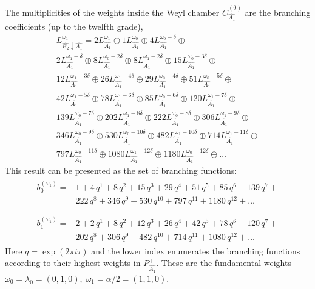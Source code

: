 \documentclass[12pt]{iopart}
\theoremstyle{definition}
\begin{document}
The multiplicities of the weights inside the  Weyl chamber
$\bar{C}^{\left( 0 \right)}_{\hat{A_1}}$
are the branching coefficients (up to the twelfth grade),
\begin{eqnarray*}
  \label{eq:28}
  L^{\omega_1}_{\hat{B_2}\downarrow \hat{A_1}}=2 L_{\hat{A_1}}^{\omega_1}\oplus 1 L_{\hat{A_1}}^{\omega_0}\oplus 4 L_{\hat{A_1}}^{\omega_0-\delta}\oplus\\
    2 L_{\hat{A_1}}^{\omega_1-\delta}\oplus 8 L_{\hat{A_1}}^{\omega_0-2\delta}\oplus
    8 L_{\hat{A_1}}^{\omega_1-2\delta}\oplus 15 L_{\hat{A_1}}^{\omega_0-3\delta}\oplus\\
    12 L_{\hat{A_1}}^{\omega_1-3\delta}\oplus 26 L_{\hat{A_1}}^{\omega_1-4\delta}\oplus
    29 L_{\hat{A_1}}^{\omega_0-4\delta}\oplus 51 L_{\hat{A_1}}^{\omega_0-5\delta}\oplus\\
    42 L_{\hat{A_1}}^{\omega_1-5\delta}\oplus 78 L_{\hat{A_1}}^{\omega_1-6\delta}\oplus
    85 L_{\hat{A_1}}^{\omega_0-6\delta}\oplus 120 L_{\hat{A_1}}^{\omega_1-7\delta}\oplus\\
    139 L_{\hat{A_1}}^{\omega_0-7\delta}\oplus 202 L_{\hat{A_1}}^{\omega_1-8\delta}\oplus
    222 L_{\hat{A_1}}^{\omega_0-8\delta}\oplus 306 L_{\hat{A_1}}^{\omega_1-9\delta}\oplus\\
    346 L_{\hat{A_1}}^{\omega_0-9\delta}\oplus 530 L_{\hat{A_1}}^{\omega_0-10\delta}\oplus
    482 L_{\hat{A_1}}^{\omega_1-10\delta}\oplus 714 L_{\hat{A_1}}^{\omega_1-11\delta}\oplus\\
    797 L_{\hat{A_1}}^{\omega_0-11\delta}\oplus 1080 L_{\hat{A_1}}^{\omega_1-12\delta}\oplus
    1180 L_{\hat{A_1}}^{\omega_0-12\delta}\oplus \dots
\end{eqnarray*}
This result can be presented as the set of branching functions:
\begin{eqnarray*}
  \label{eq:29}
  \begin{array}{cc}
    b^{(\omega_1)}_{0}= & 1 + 4\,q^{1}+ 8\,q^{2}+ 15\,q^{3}+ 29\,q^{4}+ 51\,q^{5}+ 85\,q^{6}+ 139\,q^{7}+\\
     &222\,q^{8}+ 346\,q^{9}+ 530\,q^{10}+ 797\,q^{11}+ 1180\,q^{12}+\dots\\
  \end{array}\\
  \begin{array}{cc}
    b^{(\omega_1)}_{1}= &2+2\,q^{1}+8\,q^{2}+12\,q^{3}+26\,q^{4}+42\,q^{5}+78\,q^{6}+120\,q^{7}+\\
    & 202\,q^{8}+306\,q^{9}+482\,q^{10}+714\,q^{11}+1080\,q^{12}+\dots
  \end{array}
\end{eqnarray*}
Here $q=\exp (2\pi i \tau)$ and the lower index enumerates the branching functions according
to their highest weights in $P^+_{\hat{A_1}}$.
These are the fundamental weights $\omega_0=\lambda_0=(0,1,0),\; \omega_1=\alpha/2=(1,1,0)$.
\end{document}
